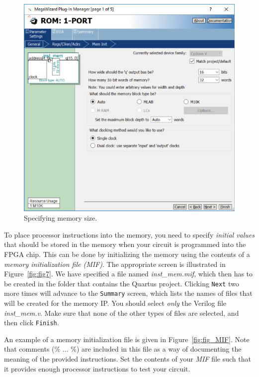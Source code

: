 \documentclass[epsfig,10pt,fullpage]{article}
\begin{document}
\begin{enumerate}
\begin{figure}[H]
	\begin{center}
		\includegraphics[scale=1.0]{figures/figure5.png}
	\end{center}
	\caption{{Specifying memory size.}}
	\label{fig:fig5}
\end{figure}

To place processor instructions into the memory, you need to specify {\it initial values}
that should be stored in the memory when your circuit is programmed into the FPGA chip.
This can be done by initializing the memory using the contents of a {\it memory initialization 
file (MIF)}. The appropriate screen is illustrated in Figure~\ref{fig:fig7}. We have specified 
a file named {\it inst\_mem.mif}, which then has to be created in the folder that 
contains the Quartus project. Clicking \texttt{Next} two more times will advance to the
\texttt{Summary} screen, which lists the names of files that will be created for the memory IP.
You should select {\it only} the Verilog file {\it inst\_mem.v}. Make sure that none of the 
other types of files are selected, and then click \texttt{Finish}.

An example of a memory initialization file is given in 
Figure~\ref{fig:fig_MIF}. Note that comments (\% $\ldots$ \%) are included in this file as a way of
documenting the meaning of the provided instructions.  Set the contents of
your {\it MIF} file such that it provides enough processor instructions to test your circuit.


\end{enumerate}
\end{document}
